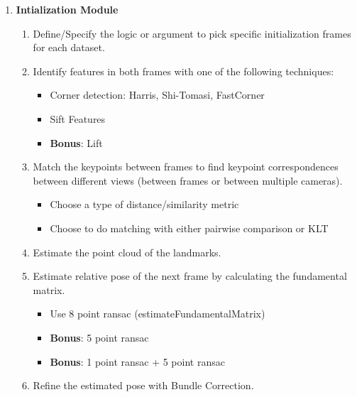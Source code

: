\begin{enumerate}
    \item \textbf{Intialization Module}
    
    \begin{enumerate}
        \item Define/Specify the logic or argument to pick specific initialization frames for each dataset.
        
        \item Identify features in both frames with one of the following techniques:
            \begin{itemize}
                \item Corner detection: Harris, Shi-Tomasi, FastCorner
                \item Sift Features
                \item \textbf{Bonus}: Lift
            \end{itemize}
        
        \item Match the keypoints between frames to find keypoint correspondences between different views (between frames or between multiple cameras).
            \begin{itemize}
                \item Choose a type of distance/similarity metric
                \item Choose to do matching with either pairwise comparison or KLT 
            \end{itemize}
        
        \item Estimate the point cloud of the landmarks.
        
        \item Estimate relative pose of the next frame by calculating the fundamental matrix.
            \begin{itemize}
                \item Use 8 point ransac (estimateFundamentalMatrix)
                \item \textbf{Bonus}: 5 point ransac
                \item \textbf{Bonus}: 1 point ransac + 5 point ransac
            \end{itemize}
        
        \item Refine the estimated pose with Bundle Correction. 
        
    \end{enumerate}
    

\end{enumerate}

